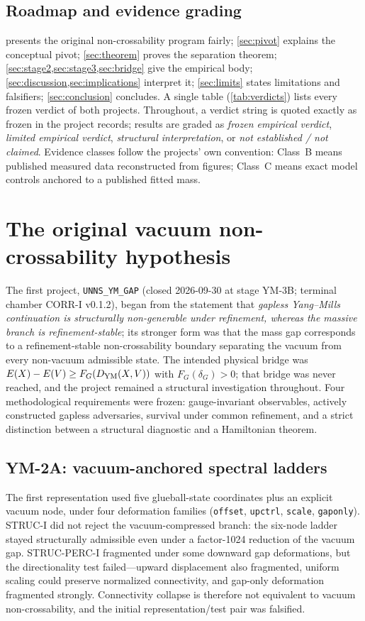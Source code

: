 \documentclass[11pt,a4paper]{article}
\theoremstyle{definition}
\theoremstyle{remark}
\begin{document}
\subsection{Roadmap and evidence grading}
 presents the original non-crossability program fairly; \cref{sec:pivot} explains the conceptual pivot; \cref{sec:theorem} proves the separation theorem; \cref{sec:stage2,sec:stage3,sec:bridge} give the empirical body; \cref{sec:discussion,sec:implications} interpret it; \cref{sec:limits} states limitations and falsifiers; \cref{sec:conclusion} concludes. A single table (\cref{tab:verdicts}) lists every frozen verdict of both projects. Throughout, a verdict string is quoted exactly as frozen in the project records; results are graded as \emph{frozen empirical verdict}, \emph{limited empirical verdict}, \emph{structural interpretation}, or \emph{not established / not claimed}. Evidence classes follow the projects' own convention: Class~B means published measured data reconstructed from figures; Class~C means exact model controls anchored to a published fitted mass.

\section{The original vacuum non-crossability hypothesis}\label{sec:original}

The first project, \texttt{UNNS\_YM\_GAP} (closed 2026-09-30 at stage YM-3B; terminal chamber CORR-I v0.1.2), began from the statement that \emph{gapless Yang--Mills continuation is structurally non-generable under refinement, whereas the massive branch is refinement-stable}; its stronger form was that the mass gap corresponds to a refinement-stable non-crossability boundary separating the vacuum from every non-vacuum admissible state. The intended physical bridge was $E(X)-E(V)\ge F_G(D_{\rm YM}(X,V))$ with $F_G(\delta_G)>0$; that bridge was never reached, and the project remained a structural investigation throughout. Four methodological requirements were frozen: gauge-invariant observables, actively constructed gapless adversaries, survival under common refinement, and a strict distinction between a structural diagnostic and a Hamiltonian theorem.

\subsection{YM-2A: vacuum-anchored spectral ladders}
The first representation used five glueball-state coordinates plus an explicit vacuum node, under four deformation families (\texttt{offset}, \texttt{upctrl}, \texttt{scale}, \texttt{gaponly}). STRUC-I did not reject the vacuum-compressed branch: the six-node ladder stayed structurally admissible even under a factor-1024 reduction of the vacuum gap. STRUC-PERC-I fragmented under some downward gap deformations, but the directionality test failed---upward displacement also fragmented, uniform scaling could preserve normalized connectivity, and gap-only deformation fragmented strongly. Connectivity collapse is therefore not equivalent to vacuum non-crossability, and the initial representation/test pair was falsified.
\end{document}
